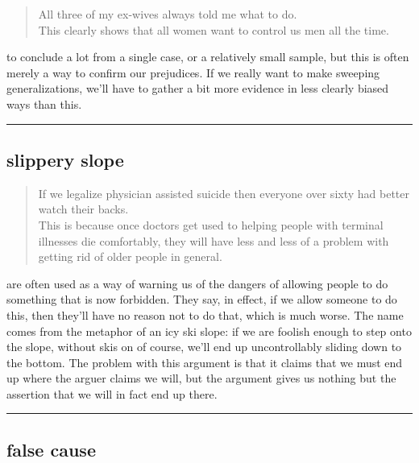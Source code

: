 \documentclass[justified]{tufte-book}
\newenvironment{argument}{\begin{quote}\normalsize}{\end{quote}}
\begin{document}
\begin{argument}
All three of my ex-wives always told me what to do.\\
This clearly shows that all women want to control us men all the time.
\end{argument}

 to conclude a lot from a single case, or a relatively small sample, but this is often merely a way to confirm our prejudices. If we really want to make sweeping generalizations, we'll have to gather a bit more evidence in less clearly biased ways than this.

\begin{center}\rule{0.5\linewidth}{\linethickness}\end{center}

\hypertarget{slippery-slope}{%
\subsection*{slippery slope}\label{slippery-slope}}

\begin{argument}
If we legalize physician assisted suicide then everyone over sixty had
better watch their backs.\\
This is because once doctors get used to helping people with terminal
illnesses die comfortably, they will have less and less of a problem
with getting rid of older people in general.
\end{argument}

 are often used as a way of warning us of the dangers of allowing people to do something that is now forbidden. They say, in effect, if we allow someone to do this, then they'll have no reason not to do that, which is much worse. The name comes from the metaphor of an icy ski slope: if we are foolish enough to step onto the slope, without skis on of course, we'll end up uncontrollably sliding down to the bottom. The problem with this argument is that it claims that we must end up where the arguer claims we will, but the argument gives us nothing but the assertion that we will in fact end up there.

\begin{center}\rule{0.5\linewidth}{\linethickness}\end{center}

\hypertarget{false-cause}{%
\subsection*{false cause}\label{false-cause}}
\end{document}
